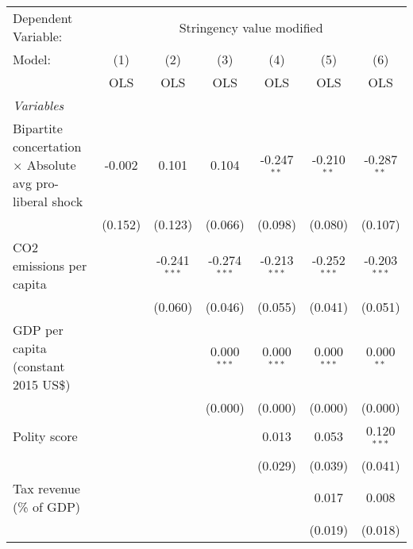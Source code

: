
\begingroup
\centering
\begin{tabular}{lcccccc}
   \toprule
   Dependent Variable: & \multicolumn{6}{c}{Stringency value modified}\\
   Model:                                                          & (1)     & (2)            & (3)            & (4)            & (5)            & (6)\\  
                                                                   &  OLS    & OLS            & OLS            & OLS            & OLS            & OLS\\  
   \midrule
   \emph{Variables}\\
   Bipartite concertation $\times$ Absolute avg pro-liberal shock  & -0.002  & 0.101          & 0.104          & -0.247$^{**}$  & -0.210$^{**}$  & -0.287$^{**}$\\   
                                                                   & (0.152) & (0.123)        & (0.066)        & (0.098)        & (0.080)        & (0.107)\\   
   CO2 emissions per capita                                        &         & -0.241$^{***}$ & -0.274$^{***}$ & -0.213$^{***}$ & -0.252$^{***}$ & -0.203$^{***}$\\   
                                                                   &         & (0.060)        & (0.046)        & (0.055)        & (0.041)        & (0.051)\\   
   GDP per capita (constant 2015 US\$)                             &         &                & 0.000$^{***}$  & 0.000$^{***}$  & 0.000$^{***}$  & 0.000$^{**}$\\   
                                                                   &         &                & (0.000)        & (0.000)        & (0.000)        & (0.000)\\   
   Polity score                                                    &         &                &                & 0.013          & 0.053          & 0.120$^{***}$\\   
                                                                   &         &                &                & (0.029)        & (0.039)        & (0.041)\\   
   Tax revenue (\% of GDP)                                         &         &                &                &                & 0.017          & 0.008\\   
                                                                   &         &                &                &                & (0.019)        & (0.018)\\   

\end{tabular}
